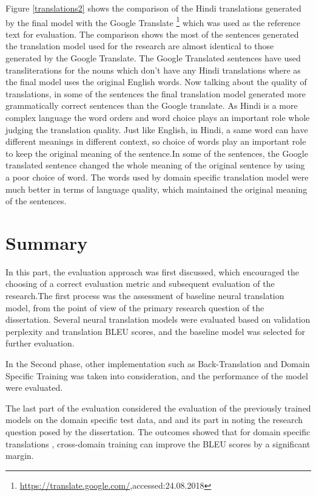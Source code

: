 Figure \ref{translations2} shows the comparison of the Hindi translations generated by the final model with the Google Translate \footnote{{\url{https://translate.google.com/},accessed:24.08.2018}} which was used as the reference text for evaluation. The comparison shows the most of the sentences generated the translation model used for the research are almost identical to those generated by the Google Translate. The Google Translated sentences have used transliterations for the nouns which don't have any Hindi translations where as the final model uses the original English words. Now talking about the quality of translations, in some of the sentences the final translation model generated more grammatically correct sentences than the Google translate. As Hindi is a more complex language the word orders and word choice plays an important role whole judging the translation quality. Just like English, in Hindi, a same word can have different meanings in different context, so choice of words play an important role to keep the original meaning of the sentence.In some of the sentences, the Google translated sentence changed the whole meaning of the original sentence by using a poor choice of word. The words used by domain specific translation model were much better in terms of language quality, which maintained the original meaning of the sentences.

\section{Summary}
In this part, the evaluation approach was first discussed, which encouraged the choosing of a correct evaluation metric and subsequent evaluation of the research.The first process was the assessment of baseline neural translation model, from the point of view of the primary research question of the dissertation. Several neural translation models were evaluated based on validation perplexity and translation BLEU scores, and the baseline model was selected for further evaluation.

In the Second phase, other implementation such as Back-Translation and Domain Specific Training was taken into consideration, and the performance of the model were evaluated.

The last part of the evaluation considered the evaluation of the previously trained models on the domain specific test data, and and its part in noting the research question posed by the dissertation. The outcomes showed that for domain specific translations , cross-domain training can improve the BLEU scores by a significant margin.
